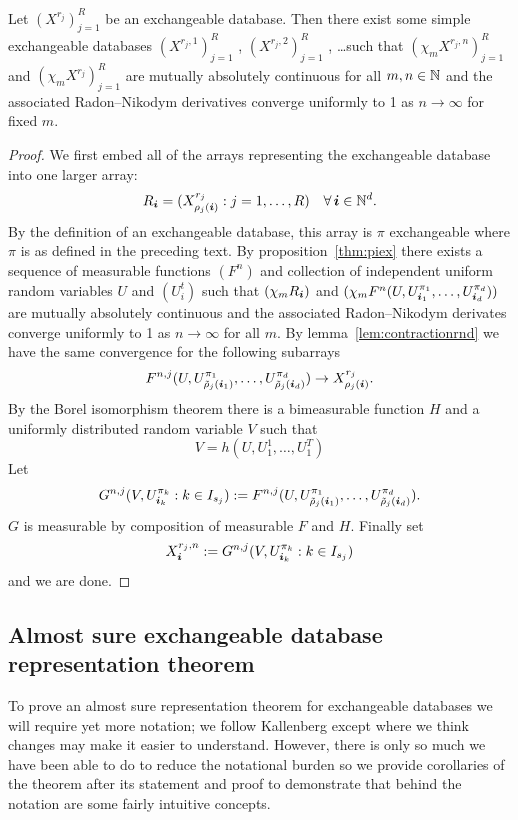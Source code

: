 \begin{thm}
  \label{thm:simple-database}
  Let $(X^{r_j})_{j=1}^R$ be an exchangeable database.
  Then there exist some simple exchangeable databases $(X^{r_j,1})_{j=1}^R$ , $(X^{r_j,2})_{j=1}^R$ , \dots such that
  $(\chi_m X^{r_j,n})_{j=1}^R$ and $(\chi_m X^{r_j})_{j=1}^R$ are mutually absolutely continuous for all $m,n \in \mathbb{N}$ and the associated Radon--Nikodym derivatives converge uniformly to 1 as $n \to \infty$ for fixed $m$.
\end{thm}

\begin{proof}
  We first embed all of the arrays representing the exchangeable database into one larger array:
  \[
    R_{\bm{i}} = (X^{r_j}_{\rho_j(\bm{i})} : j = 1,\dots,R) \quad \forall \, \bm{i} \in \mathbb{N}^d.
  \]
  By the definition of an exchangeable database, this array is $\pi$ exchangeable where $\pi$ is as defined in the preceding text.
  By proposition~\ref{thm:piex} there exists a sequence of measurable functions $(F^n)$ and collection of independent uniform random variables $U$ and $(U^t_i)$ such that $(\chi_m R_{\bm{i}})$ and $(\chi_m F^n(U, U^{\pi_1}_{\bm{i}_1}, \dots, U^{\pi_d}_{\bm{i}_d}))$ are mutually absolutely continuous and the associated Radon--Nikodym derivates converge uniformly to 1 as $n \to \infty$ for all $m$.
  By lemma~\ref{lem:contractionrnd} we have the same convergence for the following subarrays
  \[
    F^{n,j}(U, U^{\pi_1}_{\tilde{\rho}_j(\bm{i}_1)}, \dots, U^{\pi_d}_{\tilde{\rho}_j(\bm{i}_d)}) \to X^{r_j}_{\rho_j(\bm{i})}.
  \]
  By the Borel isomorphism theorem there is a bimeasurable function $H$ and a uniformly distributed random variable $V$ such that
  \[
    V = h(U, U^1_1, \dots, U^T_1)
  \]
  Let
  \[
    G^{n,j}(V, U^{\pi_k}_{\bm{i}_k} : k \in I_{s_j}) := F^{n,j}(U, U^{\pi_1}_{\tilde{\rho}_j(\bm{i}_1)}, \dots, U^{\pi_d}_{\tilde{\rho}_j(\bm{i}_d)}).
  \]
  $G$ is measurable by composition of measurable $F$ and $H$.
  Finally set
  \[
    X^{r_j,n}_{\bm{i}} := G^{n,j}(V, U^{\pi_k}_{\bm{i}_k} : k \in I_{s_j})
  \]
  and we are done.
\end{proof}

\subsection{Almost sure exchangeable database representation theorem}

To prove an almost sure representation theorem for exchangeable databases we will require yet more notation; we follow Kallenberg except where we think changes may make it easier to understand.
However, there is only so much we have been able to do to reduce the notational burden so we provide corollaries of the theorem after its statement and proof to demonstrate that behind the notation are some fairly intuitive concepts.

